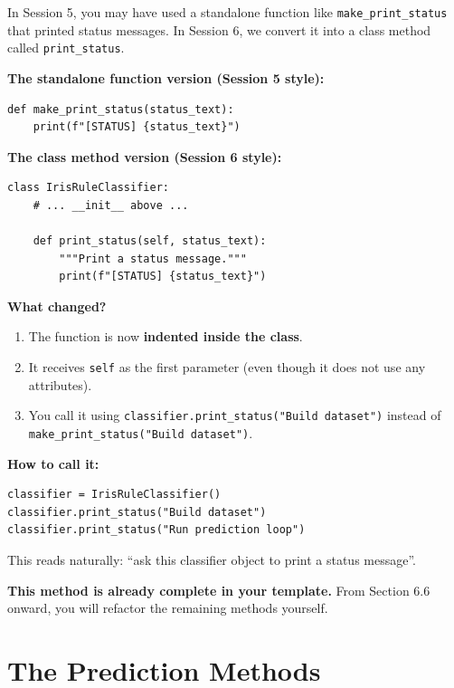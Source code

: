 \medskip
\noindent
In Session 5, you may have used a standalone function like \texttt{make\_print\_status} that printed status messages.
In Session 6, we convert it into a class method called \texttt{print\_status}.

\medskip
\noindent
\textbf{The standalone function version (Session 5 style):}
\begin{verbatim}
def make_print_status(status_text):
    print(f"[STATUS] {status_text}")
\end{verbatim}

\noindent
\textbf{The class method version (Session 6 style):}
\begin{verbatim}
class IrisRuleClassifier:
    # ... __init__ above ...

    def print_status(self, status_text):
        """Print a status message."""
        print(f"[STATUS] {status_text}")
\end{verbatim}

\noindent
\textbf{What changed?}
\begin{enumerate}\setlength{\itemsep}{2pt}
    \item The function is now \textbf{indented inside the class}.
    \item It receives \texttt{self} as the first parameter (even though it does not use any attributes).
    \item You call it using \texttt{classifier.print\_status("Build dataset")} instead of \texttt{make\_print\_status("Build dataset")}.
\end{enumerate}

\noindent
\textbf{How to call it:}
\begin{verbatim}
classifier = IrisRuleClassifier()
classifier.print_status("Build dataset")
classifier.print_status("Run prediction loop")
\end{verbatim}

\noindent
This reads naturally: ``ask this classifier object to print a status message''.

\medskip
\noindent
\textbf{This method is already complete in your template.}
From Section 6.6 onward, you will refactor the remaining methods yourself.

\section{The Prediction Methods}

